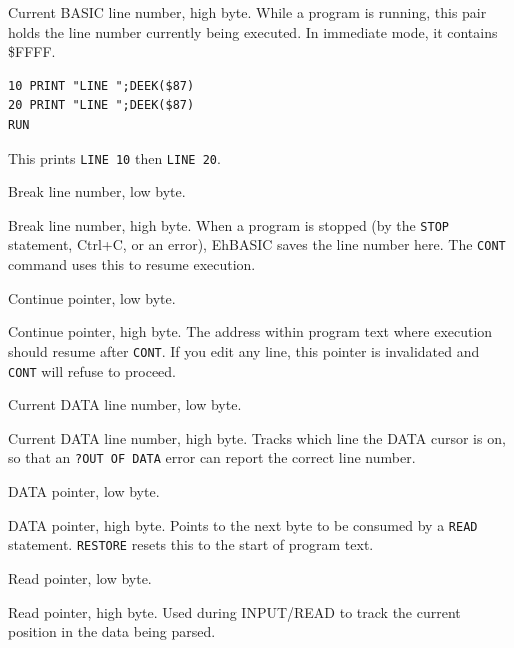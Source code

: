 
Current BASIC line number, high byte.  While a program is running, this pair
holds the line number currently being executed.  In immediate mode, it
contains \$FFFF.

\begin{lstlisting}
10 PRINT "LINE ";DEEK($87)
20 PRINT "LINE ";DEEK($87)
RUN
\end{lstlisting}

This prints \texttt{LINE 10} then \texttt{LINE 20}.


Break line number, low byte.


Break line number, high byte.  When a program is stopped (by the \texttt{STOP}
statement, Ctrl+C, or an error), EhBASIC saves the line number here.  The
\texttt{CONT} command uses this to resume execution.


Continue pointer, low byte.


Continue pointer, high byte.  The address within program text where execution
should resume after \texttt{CONT}.  If you edit any line, this pointer is
invalidated and \texttt{CONT} will refuse to proceed.


Current DATA line number, low byte.


Current DATA line number, high byte.  Tracks which line the DATA cursor is on,
so that an \texttt{?OUT OF DATA} error can report the correct line number.


DATA pointer, low byte.


DATA pointer, high byte.  Points to the next byte to be consumed by a
\texttt{READ} statement.  \texttt{RESTORE} resets this to the start of program
text.


Read pointer, low byte.


Read pointer, high byte.  Used during INPUT/READ to track the current position
in the data being parsed.


